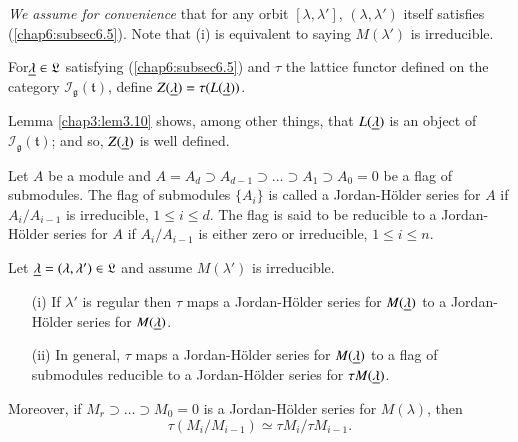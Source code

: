 \textit{We assume for convenience} that for any orbit
$[\lambda,\lambda']$, $(\lambda, \lambda')$ itself satisfies
(\ref{chap6:subsec6.5}). Note that (i) is equivalent to saying $M(\lambda')$ is
irreducible.

\setcounter{prop}{5}
\begin{definition}\label{chap6:def6.6}
For\pageoriginale $\underline{\lambda} \in \mathfrak{L}$ satisfying
(\ref{chap6:subsec6.5}) and 
$\tau$ the lattice functor defined on the category $\mathscr{I}_
\mathfrak{g}( \mathfrak{t})$, define $Z(\underline{\lambda}) = \tau (L(\underline{\lambda}))$.
\end{definition}

Lemma \ref{chap3:lem3.10} shows, among other things, that
$L(\underline{\lambda})$ is an 
object of $ \mathscr{I}_ \mathfrak{g}( \mathfrak{t})$; and so,
$Z(\underline{\lambda})$ is well defined.

\begin{definition}\label{chap6:def6.7}
Let $A$ be a module and $A = A_d \supset A_{d-1} \supset \ldots
\supset A_1 \supset A_0 =0$ be a flag of submodules. The flag of
submodules $\{A_i\}$ is called a Jordan-H\"older series for $A$ if
$A_i /A_{i-1}$ is irreducible, $1\leq i \leq d$. The flag is said to
be reducible to a Jordan-H\"older series for $A$ if $A_i/A_{i-1}$ is
either zero or irreducible, $1 \leq i \leq n$. 
\end{definition}

\begin{prop}\label{chap6:prop6.8}
Let $\underline{\lambda} = (\lambda, \lambda') \in  \mathfrak{L}$ and assume
$M(\lambda')$ is irreducible. 
\begin{itemize}
\item[{\rm (i)}] If $\lambda'$ is regular then $\tau$ maps a
  Jordan-H\"older series for $M(\underline{\lambda})$ to a Jordan-H\"older
  series for $M(\underline{\lambda})$.

\item[{\rm (ii)}] In general, $\tau$ maps a Jordan-H\"older series for
  $M(\underline{\lambda})$ to a flag of submodules reducible to a
  Jordan-H\"older series for $\tau M(\underline{\lambda})$.
\end{itemize}

Moreover, if $M_r \supset \ldots \supset M_0 =0$ is a Jordan-H\"older
series for $M(\lambda)$, then
\begin{equation*}
\tau (M_i / M_{i-1}) \simeq \tau M_i / \tau M_{i-1}. \tag*{$(\ast)$}\label{eqast}
\end{equation*}
\end{prop}

